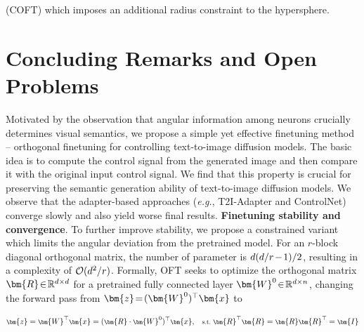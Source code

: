 \begin{itemize}[leftmargin=*,nosep]
\begin{itemize}[leftmargin=*,nosep]
(COFT) which imposes an additional radius constraint to the hypersphere. \section{Concluding Remarks and Open Problems}

Motivated by the observation that angular information among neurons crucially determines visual semantics, we propose a simple yet effective finetuning method – orthogonal finetuning for controlling text-to-image diffusion models. The basic idea is to compute the control signal from the generated image and then compare it with the original input control signal. We find that this property is crucial for preserving the semantic generation ability of text-to-image diffusion models. We observe that the adapter-based approaches (\emph{e.g.}, T2I-Adapter and ControlNet) converge slowly and also yield worse final results. \textbf{Finetuning stability and convergence}. To further improve stability, we propose a constrained variant which limits the angular deviation from the pretrained model. For an $r$-block diagonal orthogonal matrix, the number of parameter is $\thickmuskip=2mu \medmuskip=2mu d(d/r-1)/2$, resulting in a complexity of $\thickmuskip=2mu \medmuskip=2mu \mathcal{O}(d^2/r)$. Formally, OFT seeks to optimize the orthogonal matrix $\thickmuskip=2mu \medmuskip=2mu \bm{R}\in\mathbb{R}^{d \times d}$ for a pretrained fully connected layer $\thickmuskip=2mu \medmuskip=2mu\bm{W}^0\in\mathbb{R}^{d\times n}$, changing the forward pass from $\thickmuskip=2mu \medmuskip=2mu\bm{z}=(\bm{W}^0)^\top\bm{x}$ to

\begin{equation}\label{eq:oft_general}
    \footnotesize
    \bm{z}=\bm{W}^\top\bm{x}=(\bm{R}\cdot\bm{W}^0)^\top\bm{x},~~~\text{s.t.}~\bm{R}^\top\bm{R}=\bm{R}\bm{R}^\top=\bm{I}
\end{equation}


\end{itemize}
\end{itemize}
